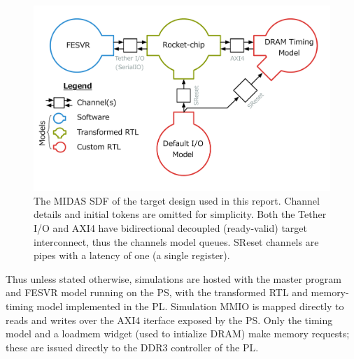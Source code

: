 \begin{figure}
	\centering
	\includegraphics[width=16cm]{figures/masters-target.pdf}
    \caption{The MIDAS SDF of the target design used in this report. Channel
    details and initial tokens are omitted for simplicity. Both the Tether I/O
    and AXI4 have bidirectional decoupled (ready-valid) target interconnect,
    thus the channels model queues. SReset channels are pipes with
    a latency of one (a single register).}
	\label{fig:default-target}
\end{figure}

Thus unless stated otherwise, simulations are hosted with the master program
and FESVR model running on the PS, with the transformed RTL and memory-timing
model implemented in the PL. Simulation MMIO is mapped directly to reads and
writes over the AXI4 iterface exposed by the PS. Only the timing model and a
loadmem widget (used to intialize DRAM) make memory requests; these are issued
directly to the DDR3 controller of the PL.
